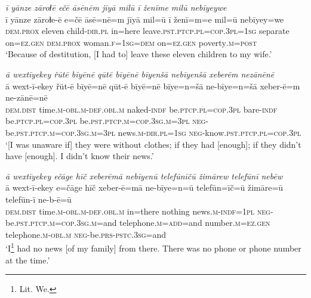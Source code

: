 \ea \label{ŽM.27}
\textit{ī yānze zāroɫē ečē āsēnēm jīyā milū ī ženīme milū nebīyeywe} \\ 
\gll ī yānze zāroɫe-ē e=čē āsē=nē=m jīyā mil=ū ī ženī=m=e mil=ū nebīyey=we \\ 
 \textsc{dem.prox} eleven child\textsc{-dir}\textsc{.pl} in=here leave\textsc{.pst}\textsc{.ptcp}\textsc{.pl}\textsc{=cop}\textsc{.3pl}\textsc{=\textsc{1sg}} separate on\textsc{=ez.gen} \textsc{dem.prox} woman\textsc{.f}\textsc{=\textsc{1sg}}\textsc{=dem} on\textsc{=ez.gen} poverty\textsc{.m}\textsc{=\textsc{post}} \\ 
\glt `Because of destitution, [I had to] leave these eleven children to my wife.'
\z 
 
\ea \label{ŽM.30}
\textit{ā wextīyekey řūtē bīyēnē qūtē bīyēnē bīyenšā nebīyenšā xeberēm nezānēnē} \\ 
\gll ā wext-ī-ekey řūt-ē bīyē=nē qūt-ē bīyē=nē bīye=n=šā ne-bīye=n=šā xeber-ē=m ne-zānē=nē \\ 
 \textsc{dem.dist} time\textsc{.m}\textsc{-obl}\textsc{.m}\textsc{-def}\textsc{.obl}\textsc{.m} naked\textsc{-indf} be\textsc{.ptcp}\textsc{.pl}\textsc{=cop}\textsc{.3pl} bare\textsc{-indf} be\textsc{.ptcp}\textsc{.pl}\textsc{=cop}\textsc{.3pl} be\textsc{.pst}\textsc{.ptcp}\textsc{.m}\textsc{=cop}\textsc{.3sg}\textsc{.m}\textsc{=3pl} \textsc{neg-}be\textsc{.pst}\textsc{.ptcp}\textsc{.m}\textsc{=cop}\textsc{.3sg}\textsc{.m}\textsc{=3pl} news\textsc{.m}\textsc{-dir}\textsc{.pl}\textsc{=\textsc{1sg}} \textsc{neg-}know\textsc{.pst}\textsc{.ptcp}\textsc{.pl}\textsc{=cop}\textsc{.3pl} \\ 
\glt `[I was unaware if] they were without clothes; if they had [enough]; if they didn’t have [enough]. I didn't know their news.'
\z 
 
\ea \label{ŽM.32}
\textit{ā wextīyekey ečāge hīč xeberēmā nebīyenū telefūnīčū žimārew telefūnī nebēw} \\ 
\gll ā wext-ī-ekey e=čāge hīč xeber-ē=mā ne-bīye=n=ū telefūn=īč=ū žimāre=ū telefūn-ī ne-b-ē=ū \\ 
 \textsc{dem.dist} time\textsc{.m}\textsc{-obl}\textsc{.m}\textsc{-def}\textsc{.obl}\textsc{.m} in=there nothing news\textsc{.m}\textsc{-indf}\textsc{=\textsc{1pl}} \textsc{neg-}be\textsc{.pst}\textsc{.ptcp}\textsc{.m}\textsc{=cop}\textsc{.3sg}\textsc{.m}=and telephone\textsc{.m}\textsc{=add}=and number\textsc{.m}\textsc{=ez.gen} telephone\textsc{.m}\textsc{-obl}\textsc{.m} \textsc{neg-}be\textsc{.prs}\textsc{-pstc}\textsc{.3sg}=and \\ 
\glt `I\footnote{Lit. We.}  had no news [of my family] from there. There was no phone or phone number at the time.'
\z 
 
